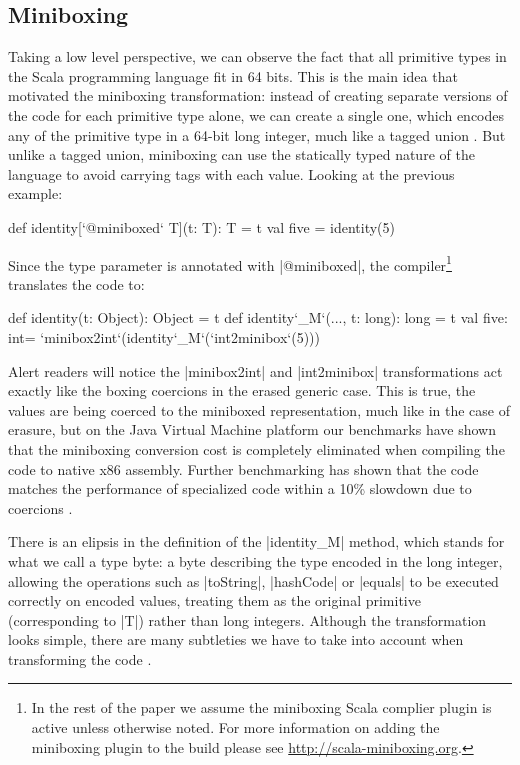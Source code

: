 \subsection{Miniboxing}

Taking a low level perspective, we can observe the fact that all primitive types in the Scala programming language fit in 64 bits. This is the main idea that motivated the miniboxing transformation: instead of creating separate versions of the code for each primitive type alone, we can create a single one, which encodes any of the primitive type in a 64-bit long integer, much like a tagged union \cite{tagged-unions-lua}. But unlike a tagged union, miniboxing can use the statically typed nature of the language to avoid carrying tags with each value. Looking at the previous example:

\begin{lstlisting-nobreak}
 def identity[`@miniboxed` T](t: T): T = t
 val five = identity(5)
\end{lstlisting-nobreak}

Since the type parameter is annotated with |@miniboxed|, the compiler\footnote{In the rest of the paper we assume the miniboxing Scala complier plugin is active unless otherwise noted. For more information on adding the miniboxing plugin to the build please see \url{http://scala-miniboxing.org}.} translates the code to:

\begin{lstlisting-nobreak}
 def identity(t: Object): Object = t
 def identity`_M`(..., t: long): long = t
 val five: int= `minibox2int`(identity`_M`(`int2minibox`(5)))
\end{lstlisting-nobreak}

Alert readers will notice the |minibox2int| and |int2minibox| transformations act exactly like the boxing coercions in the erased generic case. This is true, the values are being coerced to the miniboxed representation, much like in the case of erasure, but on the Java Virtual Machine platform our benchmarks have shown that the miniboxing conversion cost is completely eliminated when compiling the code to native x86 assembly. Further benchmarking has shown that the code matches the performance of specialized code within a 10\% slowdown due to coercions \cite{miniboxing}.

There is an elipsis in the definition of the |identity_M| method, which stands for what we call a type byte: a byte describing the type encoded in the long integer, allowing the operations such as |toString|, |hashCode| or |equals| to be executed correctly on encoded values, treating them as the original primitive (corresponding to |T|) rather than long integers. Although the transformation looks simple, there are many subtleties we have to take into account when transforming the code \cite{miniboxing,miniboxing-linkedlist,ldl}.

